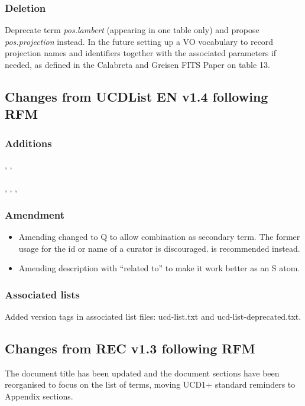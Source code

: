 \documentclass[11pt,a4paper]{ivoa}
\begin{document}
\subsubsection*{Deletion}
Deprecate term \emph{pos.lambert} (appearing in one table only) and propose \emph{pos.projection} instead.
In the future  setting up a VO vocabulary to record  projection names and identifiers together with the associated 
parameters if needed, as defined in the Calabreta  and Greisen FITS Paper  \citep{2002A_A...395.1077C} on table 13.

\subsection{Changes from UCDList EN v1.4 following RFM}
\subsubsection*{Additions}
, , \\
 \\
, , ,  \\

\subsubsection*{Amendment}
\begin{itemize}
\item Amending  changed to Q to allow combination as secondary term.
The former usage  for the id or name of a curator is
discouraged.  is recommended instead.
\item Amending  description with ``related to'' to make
it work better as an S atom.
\end{itemize}

\subsubsection*{Associated lists} 
Added version tags in associated list files: ucd-list.txt and ucd-list-deprecated.txt.
\subsection{Changes from REC v1.3 following RFM}
The document title has been updated and the document sections have been reorganised to focus on 
the list of terms, moving UCD1+ standard reminders to Appendix sections. 
\end{document}
